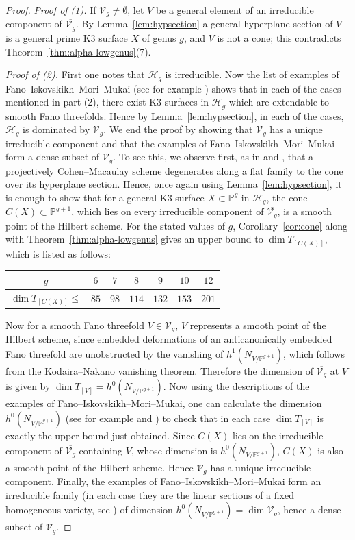 \documentclass[11pt,twoside]{amsart}
\theoremstyle{plain}
\theoremstyle{definition}
\newcommand{\PP}{\mathbb{P}}
\begin{document}
\begin{proof}
\emph{Proof of (1).} If $\mathcal V_g\neq\emptyset$, let $V$ be a general element of an irreducible component of $\overline{\mathcal V_g}$. By Lemma~\ref{lem:hypsection} a general hyperplane section of $V$ is a general prime K3 surface $X$ of genus $g$, and $V$ is not a cone; this contradicts Theorem~\ref{thm:alpha-lowgenus}(7).

\emph{Proof of (2).} First one notes that $\mathcal H_g$ is irreducible. Now the list of examples of Fano--Iskovskikh--Mori--Mukai (see for example \cite[Table~3.1]{CLM98}) shows that in each of the cases mentioned in part (2), there exist K3 surfaces in $\mathcal H_g$ which are extendable to smooth Fano threefolds. Hence by Lemma~\ref{lem:hypsection}, in each of the cases, $\mathcal H_g$ is dominated by $\mathcal V_g$. We end the proof by showing that $\overline{\mathcal V_g}$ has a unique irreducible component and that the examples of Fano--Iskovskikh--Mori--Mukai form a dense subset of $\mathcal V_g$. To see this, we observe first, as in \cite{CLM93} and \cite{CLM98}, that a projectively Cohen--Macaulay scheme degenerates along a flat family to the cone over its hyperplane section. Hence, once again using Lemma~\ref{lem:hypsection}, it is enough to show that for a general K3 surface $X\subset\PP^g$ in $\mathcal H_g$, the cone $C(X)\subset\PP^{g+1}$, which lies on every irreducible component of $\overline{\mathcal V_g}$, is a smooth point of the Hilbert scheme. For the stated values of $g$, Corollary~\ref{cor:cone} along with Theorem~\ref{thm:alpha-lowgenus} gives an upper bound to $\dim T_{[C(X)]}$, which is listed as follows:
\begin{center}
\begin{tabular}{c|cccccc}
$g$ & $6$ & $7$ & $8$ & $9$ & $10$ & $12$\\ \hline
$\dim T_{[C(X)]}\le$ & $85$ & $98$ & $114$ & $132$ & $153$ & $201$
\end{tabular}
\end{center}
Now for a smooth Fano threefold $V\in\mathcal V_g$, $V$ represents a smooth point of the Hilbert scheme, since embedded deformations of an anticanonically embedded Fano threefold are unobstructed by the vanishing of $h^1(N_{V/\PP^{g+1}})$, which follows from the Kodaira--Nakano vanishing theorem. Therefore the dimension of $\overline{\mathcal V_g}$ at $V$ is given by $\dim T_{[V]}=h^0(N_{V/\PP^{g+1}})$. Now using the descriptions of the examples of Fano--Iskovskikh--Mori--Mukai, one can calculate the dimension $h^0(N_{V/\PP^{g+1}})$ (see for example \cite[Table~2, p.~666]{CLM93} and \cite[Table~3.1]{CLM98}) to check that in each case $\dim T_{[V]}$ is exactly the upper bound just obtained. Since $C(X)$ lies on the irreducible component of $\overline{\mathcal V_g}$ containing $V$, whose dimension is $h^0(N_{V/\PP^{g+1}})$, $C(X)$ is also a smooth point of the Hilbert scheme. Hence $\overline{\mathcal V_g}$ has a unique irreducible component. Finally, the examples of Fano--Iskovskikh--Mori--Mukai form an irreducible family (in each case they are the linear sections of a fixed homogeneous variety, see \cite{Muk88}) of dimension $h^0(N_{V/\PP^{g+1}})=\dim\mathcal V_g$, hence a dense subset of $\mathcal V_g$.
\end{proof}
\end{document}
